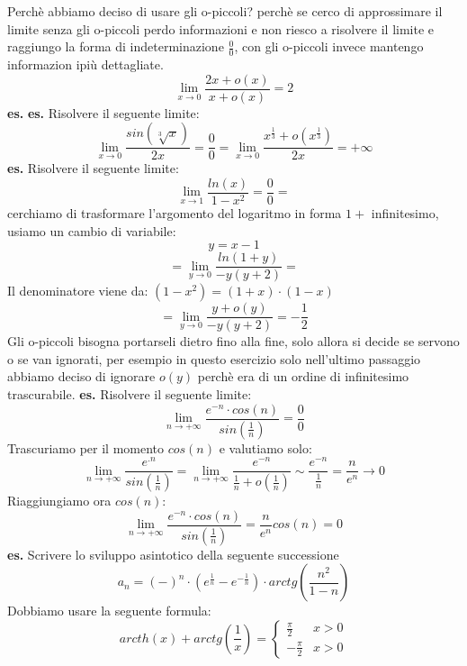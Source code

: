 \newline
Perchè abbiamo deciso di usare gli o-piccoli? perchè se cerco di approssimare il limite senza gli o-piccoli perdo informazioni e non riesco a risolvere il limite e raggiungo la forma di indeterminazione $\frac{0}{0}$, con gli o-piccoli invece mantengo informazion ipiù dettagliate.
\[
    \lim_{x\rightarrow 0} \frac{2x+o(x)}{x+o(x)} = 2
\]
\newline
\newline
\textbf{es.} \textbf{es.}  Risolvere il seguente limite:
\[
    \lim_{x\rightarrow 0} \frac{sin(\sqrt[3]{x})}{2x} = \frac{0}{0}= \lim_{x\rightarrow 0} \frac{x^{\frac{1}{3}} + o (x ^{\frac{1}{3}})}{2x} = + \infty
\]
\newline
\newline
\textbf{es.}  Risolvere il seguente limite:
\[
    \lim_{x\rightarrow 1} \frac{ln(x)}{1-x^2} = \frac{0}{0} = 
\]
cerchiamo di trasformare l'argomento del logaritmo in forma $1 +$ infinitesimo, usiamo un cambio di variabile:
\[
    y=x-1
\]
\[
    =\lim_{y\rightarrow 0} \frac{ln(1+y)}{-y(y+2)} =
\]
Il denominatore viene da: $(1-x^2) = (1+x)\cdot(1-x)$
\[
    = \lim_{y\rightarrow 0} \frac{y +o(y)}{-y(y+2)} = -\frac{1}{2}
\]
Gli o-piccoli bisogna portarseli dietro fino alla fine, solo allora si decide se servono o se van ignorati, per esempio in questo esercizio solo nell'ultimo passaggio abbiamo deciso di ignorare $o(y)$ perchè era di un ordine di infinitesimo trascurabile.
\newline
\newline
\newline
\textbf{es.} Risolvere il seguente limite:
\[
    \lim_{n\rightarrow + \infty} \frac{e^{-n} \cdot cos(n)}{sin(\frac{1}{n})} = \frac{0}{0}
\]
Trascuriamo per il momento $cos(n)$ e valutiamo solo:
\[
    \lim_{n\rightarrow + \infty}\frac{e^{.n}}{sin(\frac{1}{n})} = \lim_{n\rightarrow  +\infty} \frac{e^{-n}}{\frac{1}{n} + o (\frac{1}{n})} \sim  \frac{e^{-n}}{\frac{1}{n}} = \frac{n}{e^n} \rightarrow 0
\]
Riaggiungiamo ora $cos(n)$:
\[
    \lim_{n\rightarrow + \infty} \frac{e^{-n} \cdot cos(n)}{sin(\frac{1}{n})} = \frac{n}{e^n}cos(n) = 0
\]
\newline
\newline
\textbf{es.} Scrivere lo sviluppo asintotico della seguente successione
\[
    a_n = (-)^n \cdot  (e^{\frac{1}{n}} - e^{-\frac{1}{n}}) \cdot  arctg(\frac{n^2}{1-n})
\]
Dobbiamo usare la seguente formula:
\[
    arcth(x) + arctg(\frac{1}{x}) = \begin{cases}
        \frac{\pi}{2} & x>0 \\
        -\frac{\pi}{2} & x>0
    \end{cases}
\]
